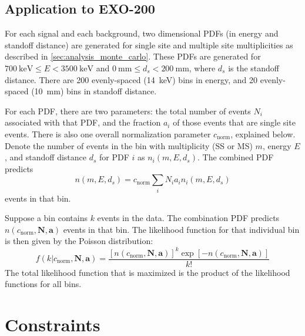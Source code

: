 \documentclass[herrin-thesis.tex]{subfiles}
\begin{document}
\subsection{Application to EXO-200}
\label{sec:analysis_fitting_exo200}
For each signal and each background, two dimensional PDFs (in energy and standoff distance) are generated for single site and multiple site multiplicities as described in \cref{sec:analysis_monte_carlo}. These PDFs are generated for \(\SI{700}{\keV} \leq E < \SI{3500}{\keV}\) and \(\SI{0}{\mm} \leq d_s < \SI{200}{\mm}\), where \(d_s\) is the standoff distance. There are 200 evenly-spaced (\SI{14}{\keV}) bins in energy, and 20 evenly-spaced (\SI{10}{\mm}) bins in standoff distance.

For each PDF, there are two parameters: the total number of events \(N_i\) associated with that PDF, and the fraction \(a_i\) of those events that are single site events. There is also one overall normalization parameter \(c_\text{norm}\), explained below. Denote the number of events in the bin with multiplicity (SS or MS) \(m\), energy \(E\), and standoff distance \(d_s\) for PDF \(i\) as \(n_i(m, E, d_s)\). The combined PDF predicts
\begin{equation}
n(m, E, d_s) = c_\text{norm}\sum_i N_i a_i n_i(m, E, d_s)
\label{eq:analysis_sum_pdf}
\end{equation}
events in that bin.

Suppose a bin contains \(k\) events in the data. The combination PDF predicts \(n(c_\text{norm}, \mathbf{N}, \mathbf{a})\) events in that bin. The likelihood function for that individual bin is then given by the Poisson distribution:
\begin{equation}
f(k|c_\text{norm}, \mathbf{N}, \mathbf{a}) = \frac{[n(c_\text{norm}, \mathbf{N}, \mathbf{a})]^k \exp[-n(c_\text{norm}, \mathbf{N}, \mathbf{a})]}{k!}
\end{equation}
The total likelihood function that is maximized is the product of the likelihood functions for all bins.

\section{Constraints}
\end{document}
